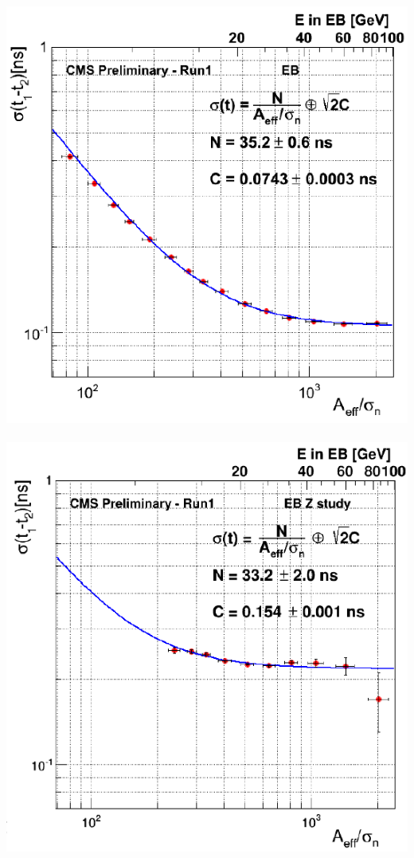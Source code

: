 \begin{center}\label{ECALTRes}
\centering
\mbox{
\includegraphics[scale=0.5]{THESISPLOTS/NeigboMethodECALTimeRes.png}\quad
\includegraphics[scale=0.5]{THESISPLOTS/ZeeECALTimeRes.png}}

\end{center}
